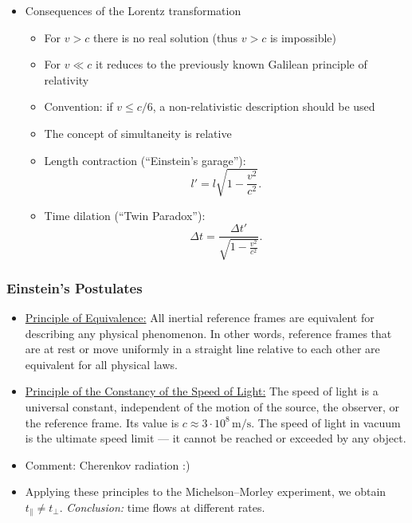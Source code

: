 \documentclass[t,aspectratio=169]{beamer}
\begin{document}
\begin{frame}
\begin{itemize}
\pagebreak
\item Consequences of the Lorentz transformation
\begin{itemize}
\item For $v > c$ there is no real solution (thus $v > c$ is impossible)
\item For $v \ll c$ it reduces to the previously known Galilean principle of relativity
\item Convention: if $v \le c/6$, a non-relativistic description should be used
\item The concept of simultaneity is relative
\item Length contraction (``Einstein's garage''): $$l' = l \sqrt{1-\frac{v^{2}}{c^{2}}}.$$
\item Time dilation (``Twin Paradox''): $$\Delta t=\frac{\Delta t'}{\sqrt{1-\frac{v^{2}}{c^{2}}}}.$$
\end{itemize}
\end{itemize}
\end{frame}


\begin{frame}%
\frametitle{Einstein's Postulates}
\begin{itemize}
\setlength{\parskip}{0pt}
\setlength{\itemsep}{0pt}
\item \underline{Principle of Equivalence:} All inertial reference frames are equivalent for describing any physical phenomenon.  
In other words, reference frames that are at rest or move uniformly in a straight line relative to each other are equivalent for all physical laws.
\item \underline{Principle of the Constancy of the Speed of Light:}  
The speed of light is a universal constant, independent of the motion of the source, the observer, or the reference frame.  
Its value is $c \approx 3 \cdot 10^{8}\,\mathrm{m/s}$.  
The speed of light in vacuum is the ultimate speed limit — it cannot be reached or exceeded by any object.
\item Comment: Cherenkov radiation :)
\item Applying these principles to the Michelson–Morley experiment, we obtain $t_{\parallel} \ne t_{\perp}$.  
\textit{Conclusion:} time flows at different rates.
\end{itemize}
\end{frame}
\end{document}
